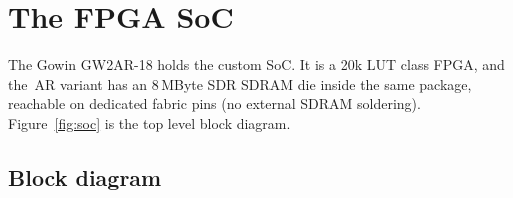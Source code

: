 \documentclass[a4paper,11pt]{article}
\begin{document}
\section{The FPGA SoC}
\label{sec:soc}

The Gowin GW2AR-18 holds the custom SoC. It is a 20k LUT class FPGA, and the
\,AR variant has an 8\,MByte SDR SDRAM die inside the same package, reachable on
dedicated fabric pins (no external SDRAM soldering). Figure~\ref{fig:soc} is the
top level block diagram.

\subsection{Block diagram}
\end{document}
